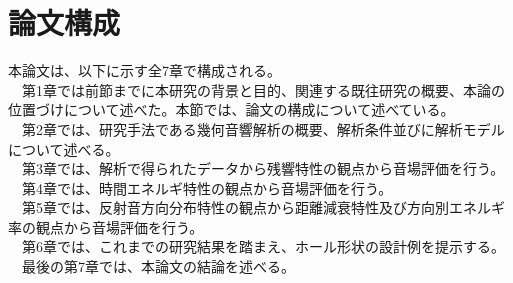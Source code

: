 \section{論文構成}
本論文は、以下に示す全7章で構成される。
\\　第1章では前節までに本研究の背景と目的、関連する既往研究の概要、本論の位置づけについて述べた。本節では、論文の構成について述べている。
\\　第2章では、研究手法である幾何音響解析の概要、解析条件並びに解析モデルについて述べる。
\\　第3章では、解析で得られたデータから残響特性の観点から音場評価を行う。
\\　第4章では、時間エネルギ特性の観点から音場評価を行う。
\\　第5章では、反射音方向分布特性の観点から距離減衰特性及び方向別エネルギ率の観点から音場評価を行う。
\\　第6章では、これまでの研究結果を踏まえ、ホール形状の設計例を提示する。
\\　最後の第7章では、本論文の結論を述べる。
